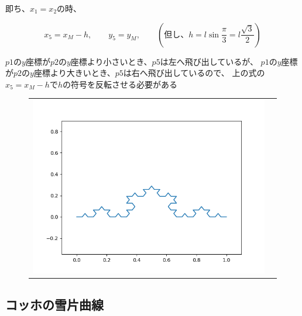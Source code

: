 \documentclass[uplatex,a4paper,11pt,oneside,openany]{jsbook}
\begin{document}
即ち、$x_1=x_2$の時、

\begin{equation*}
  x_5=x_M-h, \qquad y_5=y_M, \qquad (但し、h=l\sin\frac{\pi}{3} = l\frac{\sqrt{3}}{2})
\end{equation*}

$p1$の$y$座標が$p2$の$y$座標より小さいとき、$p5$は左へ飛び出しているが、
$p1$の$y$座標が$p2$の$y$座標より大きいとき、$p5$は右へ飛び出しているので、
上の式の$x_5=x_M-h$で$h$の符号を反転させる必要がある



\begin{figure}[H]
  \centering
  \begin{tabular}{cc}
      \begin{minipage}{0.9\hsize}
      \centering
\includegraphics[keepaspectratio,clip,scale=0.7]{../src/figure/figkoch1.png}
      \end{minipage}
      \begin{minipage}{0.1\hsize}
      \centering
      \end{minipage}
    \end{tabular}
\end{figure}%


\subsection{コッホの雪片曲線}


\end{document}
